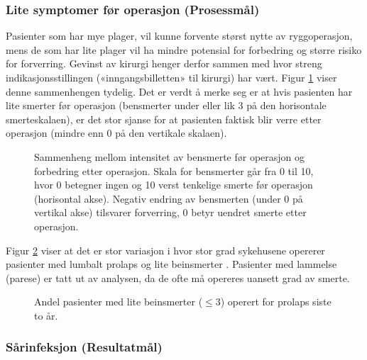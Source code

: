 \documentclass [norsk,a4paper,twoside]{article}\usepackage[]{graphicx}\usepackage[]{color}
\begin{document}
\clearpage
 \subsubsection{Lite symptomer før operasjon (Prosessmål)}    
 



      Pasienter som har mye plager, vil kunne forvente størst nytte av ryggoperasjon,
mens de som har lite plager vil ha mindre potensial for forbedring og større risiko
for forverring. Gevinst av kirurgi henger derfor sammen med hvor streng
indikasjonsstillingen («inngangsbilletten» til kirurgi) har vært. Figur \ref{fig:BeinsmEndrPre} viser denne
sammenhengen tydelig. Det er verdt å merke seg er at hvis pasienten har lite smerter før
operasjon (bensmerter under eller lik 3 på den horisontale smerteskalaen), er det stor
sjanse for at pasienten faktisk blir verre  etter
operasjon (mindre enn 0 på den vertikale skalaen). \\

\begin{figure}[ht]
\caption{\label{fig:BeinsmEndrPre}  Sammenheng mellom intensitet av bensmerte før operasjon og
      forbedring etter operasjon. Skala for bensmerter går fra 0 til 10, hvor 0 betegner
      ingen og 10 verst tenkelige smerte før operasjon (horisontal akse). Negativ endring
      av bensmerten (under 0 på vertikal akse) tilsvarer forverring, 0 betyr uendret smerte etter
      operasjon.}
\end{figure}

\clearpage

Figur \ref{fig:BeinsmLavPre} viser at det er stor variasjon i hvor stor grad sykehusene opererer
pasienter med lumbalt prolaps og lite beinsmerter . Pasienter med lammelse (parese) er tatt
ut av analysen, da de ofte må opereres uansett grad av smerte.




\begin{figure}[ht]
\caption{\label{fig:BeinsmLavPre}  Andel pasienter med lite beinsmerter ($\leq 3$) operert for prolaps siste to år.}
\end{figure}






\subsubsection{Sårinfeksjon (Resultatmål)}
\end{document}

